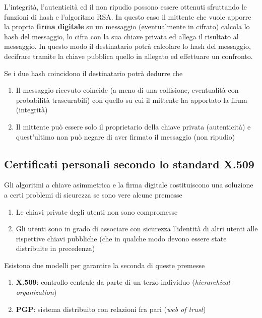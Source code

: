 \documentclass[italian,]{article}
\providecommand{\tightlist}{%
  \setlength{\itemsep}{0pt}\setlength{\parskip}{0pt}}
\begin{document}
L'integrità, l'autenticità ed il non ripudio possono essere ottenuti
sfruttando le funzioni di hash e l'algoritmo RSA. In questo caso il
mittente che vuole apporre la propria \textbf{firma digitale} su un
messaggio (eventualmente in cifrato) calcola lo hash del messaggio, lo
cifra con la sua chiave privata ed allega il risultato al messaggio. In
questo modo il destinatario potrà calcolare lo hash del messaggio,
decifrare tramite la chiave pubblica quello in allegato ed effettuare un
confronto.

Se i due hash coincidono il destinatario potrà dedurre che

\begin{enumerate}
\def\labelenumi{\arabic{enumi}.}
\tightlist
\item
  Il messaggio ricevuto coincide (a meno di una collisione, eventualità
  con probabilità trascurabili) con quello su cui il mittente ha
  apportato la firma (integrità)
\item
  Il mittente può essere solo il proprietario della chiave privata
  (autenticità) e quest'ultimo non può negare di aver firmato il
  messaggio (non ripudio)
\end{enumerate}

\subsection{Certificati personali secondo lo standard
X.509}\label{certificati-personali-secondo-lo-standard-x.509}

Gli algoritmi a chiave asimmetrica e la firma digitale costituiscono una
soluzione a certi problemi di sicurezza se sono vere alcune premesse

\begin{enumerate}
\def\labelenumi{\arabic{enumi}.}
\tightlist
\item
  Le chiavi private degli utenti non sono compromesse
\item
  Gli utenti sono in grado di associare con sicurezza l'identità di
  altri utenti alle rispettive chiavi pubbliche (che in qualche modo
  devono essere state distribuite in precedenza)
\end{enumerate}

Esistono due modelli per garantire la seconda di queste premesse

\begin{enumerate}
\def\labelenumi{\arabic{enumi}.}
\tightlist
\item
  \textbf{X.509}: controllo centrale da parte di un terzo individuo
  (\emph{hierarchical organization})
\item
  \textbf{PGP}: sistema distribuito con relazioni fra pari (\emph{web of
  trust})
\end{enumerate}
\end{document}
